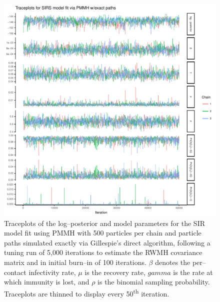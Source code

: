 \begin{figure}[htbp]
	\centering
	\includegraphics[width=0.9\linewidth]{figures/sirs_pomp_exact_traceplots}
	\caption{Traceplots of the log--posterior and model parameters for the SIR model fit using PMMH with 500 particles per chain and particle paths simulated exactly via Gillespie's direct algorithm, following a tuning run of 5,000 iterations to estimate the RWMH covariance matrix and in initial burn--in of 100 iterations. $ \beta $ denotes the per--contact infectivity rate, $ \mu $ is the recovery rate, $ gamma $ is the rate at which immunity is lost, and $ \rho $ is the binomial sampling probability. Traceplots are thinned to display every 50\textsuperscript{th} iteration.}
	\label{fig:sirspompexacttraceplots}
\end{figure}

